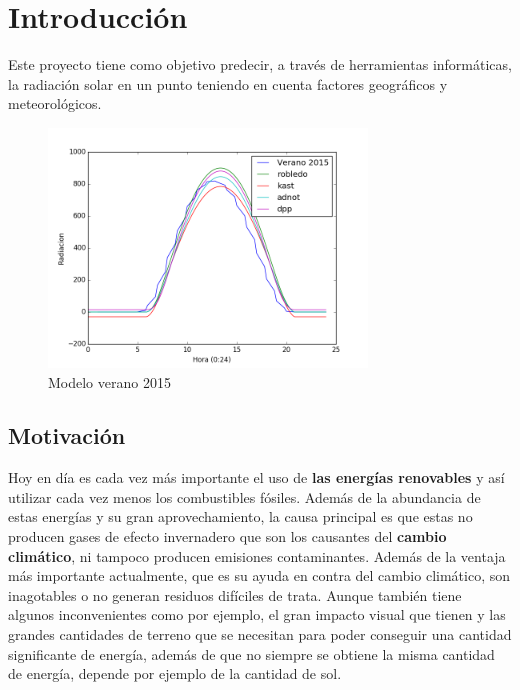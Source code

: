 \cleardoublepage

\chapter{Introducción}
\label{makereference}

Este proyecto tiene como objetivo predecir, a través de herramientas informáticas, la radiación solar en un punto teniendo en cuenta factores geográficos y meteorológicos.


\begin{figure}[htb]%
	
	\begin{center}
		\includegraphics[height=2.5in]{figures/verano2015.png}
		\caption{Modelo verano 2015}
	\end{center}
    
    \label{figure1}
\end{figure}

\section{Motivación}
\label{makereference1.1}

Hoy en día es cada vez más importante el uso de \textbf{las energías renovables} y así utilizar cada vez menos los combustibles fósiles. Además de la abundancia de estas energías y su gran aprovechamiento, la causa principal es que estas no producen gases de efecto invernadero que son los causantes del \textbf{cambio climático}, ni tampoco producen emisiones contaminantes. Además de la ventaja más importante actualmente, que es su ayuda en contra del cambio climático, son inagotables o no generan residuos difíciles de trata. Aunque también tiene algunos inconvenientes como por ejemplo, el gran impacto visual que tienen y las grandes cantidades de terreno que se necesitan para poder conseguir una cantidad significante de energía, además de que no siempre se obtiene la misma cantidad de energía, depende por ejemplo de la cantidad de sol.

